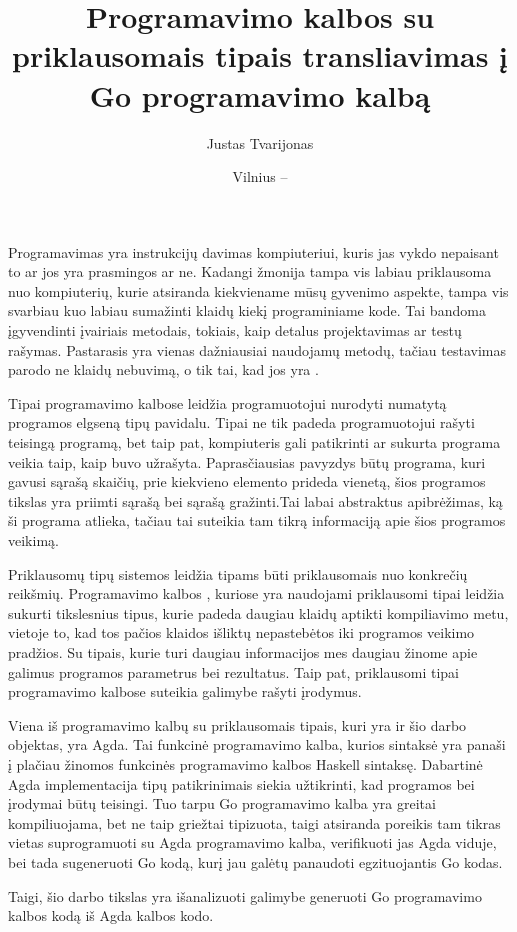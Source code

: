 \documentclass{VUMIFPSkursinis}
\title{Programavimo kalbos su priklausomais tipais transliavimas į Go programavimo kalbą}
\author{Justas Tvarijonas}
\date{Vilnius – \the\year}
\begin{document}
\maketitle

\tableofcontents

Programavimas yra instrukcijų davimas kompiuteriui, kuris jas vykdo nepaisant to ar jos yra prasmingos ar ne. Kadangi žmonija tampa vis labiau priklausoma nuo kompiuterių, kurie atsiranda kiekviename mūsų gyvenimo aspekte, tampa vis svarbiau kuo labiau sumažinti klaidų kiekį programiniame kode. Tai bandoma įgyvendinti įvairiais metodais, tokiais, kaip detalus projektavimas ar testų rašymas. Pastarasis yra vienas dažniausiai naudojamų metodų, tačiau testavimas parodo ne klaidų nebuvimą, o tik tai, kad jos yra \cite{UHC}.
\par Tipai programavimo kalbose leidžia programuotojui nurodyti numatytą programos elgseną tipų pavidalu. Tipai ne tik padeda programuotojui rašyti teisingą programą, bet taip pat, kompiuteris gali patikrinti ar sukurta programa veikia taip, kaip buvo užrašyta. Paprasčiausias pavyzdys būtų programa, kuri gavusi sąrašą skaičių, prie kiekvieno elemento prideda vienetą, šios programos tikslas yra priimti sąrašą bei sąrašą gražinti.Tai labai abstraktus apibrėžimas, ką ši programa atlieka, tačiau tai suteikia tam tikrą informaciją apie šios programos veikimą.\par
Priklausomų tipų sistemos \cite{schematicApproach} leidžia tipams būti priklausomais nuo konkrečių reikšmių. Programavimo kalbos \cite{agda_book,idris}, kuriose yra naudojami priklausomi tipai leidžia sukurti tikslesnius tipus, kurie padeda daugiau klaidų aptikti kompiliavimo metu, vietoje to, kad tos pačios klaidos išliktų nepastebėtos iki programos veikimo pradžios. Su tipais, kurie turi daugiau informacijos mes daugiau žinome apie galimus programos parametrus bei rezultatus. Taip pat, priklausomi tipai programavimo kalbose suteikia galimybe rašyti įrodymus.
\par Viena iš programavimo kalbų su priklausomais tipais, kuri yra ir šio darbo objektas, yra Agda. Tai funkcinė programavimo kalba, kurios sintaksė yra panaši į plačiau žinomos funkcinės programavimo kalbos Haskell \cite{haskell} sintaksę. Dabartinė Agda implementacija tipų patikrinimais siekia užtikrinti, kad programos bei įrodymai būtų teisingi. Tuo tarpu Go programavimo kalba \cite{Go} yra greitai kompiliuojama, bet ne taip griežtai tipizuota, taigi atsiranda poreikis tam tikras vietas suprogramuoti su Agda programavimo kalba, verifikuoti jas Agda viduje, bei tada sugeneruoti Go kodą, kurį jau galėtų panaudoti egzituojantis Go kodas.\par Taigi, šio darbo tikslas yra išanalizuoti galimybe generuoti Go programavimo kalbos kodą iš Agda kalbos kodo.
\end{document}
